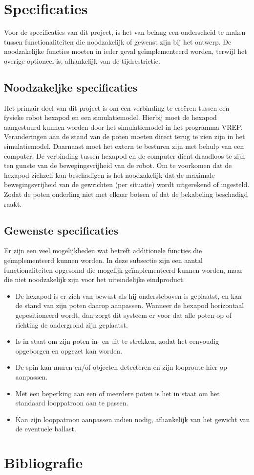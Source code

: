 \documentclass[10pt,a4paper]{article}
\begin{document}
\fi

\section{Specificaties}

Voor de specificaties van dit project, is het van belang een onderscheid te maken tussen functionaliteiten die noodzakelijk of gewenst zijn bij het ontwerp. De noodzakelijke functies moeten in ieder geval ge\"implementeerd worden, terwijl het overige optioneel is, afhankelijk van de tijdrestrictie.

\subsection{Noodzakeljke specificaties}
Het primair doel van dit project is om een verbinding te cre\"eren tussen een fysieke robot hexapod en een simulatiemodel. Hierbij moet de hexapod aangestuurd kunnen worden door het simulatiemodel in het programma VREP. Veranderingen aan de stand van de poten moeten direct terug te zien zijn in het simulatiemodel. Daarnaast moet het extern te besturen zijn met behulp van een computer. De verbinding tussen hexapod en de computer dient draadloos te zijn ten gunste van de bewegingsvrijheid van de robot. %
Om te voorkomen dat de hexapod zichzelf kan beschadigen is het noodzakelijk dat de maximale bewegingsvrijheid van de gewrichten (per situatie) wordt uitgerekend of ingesteld. Zodat de poten onderling niet met elkaar botsen of dat de bekabeling beschadigd raakt.

\subsection{Gewenste specificaties}
Er zijn een veel mogelijkheden wat betreft additionele functies die ge\"implementeerd kunnen worden. In deze subsectie zijn een aantal functionaliteiten opgesomd die mogelijk ge\"implementeerd kunnen worden, maar die niet noodzakelijk zijn voor het uiteindelijke eindproduct.

\begin{itemize}
\setlength\itemsep{0em}
\item De hexapod is er zich van bewust als hij ondersteboven is geplaatst, en kan de stand van zijn poten daarop aanpassen. Wanneer de hexapod horizontaal gepositioneerd wordt, dan zorgt dit systeem er voor dat alle poten op of richting de ondergrond zijn geplaatst.
\item Is in staat om zijn poten in- en uit te strekken, zodat het eenvoudig opgeborgen en opgezet kan worden.
\item De spin kan muren en/of objecten detecteren en zijn looproute hier op aanpassen. 
\item Met een beperking aan een of meerdere poten is het in staat om het standaard looppatroon aan te passen.
\item Kan zijn looppatroon aanpassen indien nodig, afhankelijk van het gewicht van de eventuele ballast.
\end{itemize}

\newpage

\section{Bibliografie}


\end{document}
